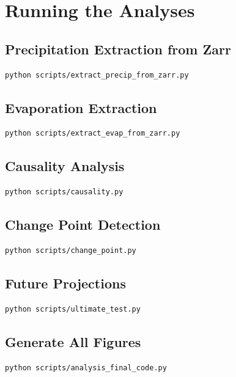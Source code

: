 \documentclass[12pt,a4paper]{article}
\begin{document}
\section{Running the Analyses}

\subsection{Precipitation Extraction from Zarr}
\begin{lstlisting}[language=bash]
python scripts/extract_precip_from_zarr.py
\end{lstlisting}

\subsection{Evaporation Extraction}
\begin{lstlisting}[language=bash]
python scripts/extract_evap_from_zarr.py
\end{lstlisting}

\subsection{Causality Analysis}
\begin{lstlisting}[language=bash]
python scripts/causality.py
\end{lstlisting}

\subsection{Change Point Detection}
\begin{lstlisting}[language=bash]
python scripts/change_point.py
\end{lstlisting}

\subsection{Future Projections}
\begin{lstlisting}[language=bash]
python scripts/ultimate_test.py
\end{lstlisting}

\subsection{Generate All Figures}
\begin{lstlisting}[language=bash]
python scripts/analysis_final_code.py
\end{lstlisting}
\end{document}
